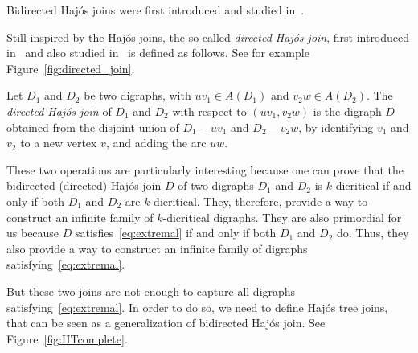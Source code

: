 Bidirected Haj\'os joins were first introduced and studied in~\cite{BBSS20}. %

Still inspired by the Haj\'os joins, the so-called \emph{directed Haj\'os join}, first introduced in~\cite{HK15} and also studied in~\cite{BBSS20} is  defined as follows.  See for example Figure~\ref{fig:directed_join}.



\begin{definition}\label{def:directed_HJ}
Let $D_1$ and $D_2$ be two digraphs, with $uv_1 \in A(D_1)$ and  $v_2w \in A(D_2)$. 
The \emph{directed Haj\'os join} of $D_1$ and $D_2$ with respect to $(uv_1, v_2w)$ is the digraph $D$ obtained from the disjoint union of $D_1- uv_1$ and $D_2 - v_2w$, by identifying $v_1$ and $v_2$ to a new vertex $v$, and adding the arc $uw$.   
\end{definition}


These two operations are particularly interesting because one can prove that the bidirected (directed) Haj\'os join 
$D$ of two digraphs $D_1$ and $D_2$ is $k$-dicritical if and only if both $D_1$ and $D_2$ are $k$-dicritical. They, therefore, provide a way to construct an infinite family of $k$-dicritical digraphs. They are also primordial for us because $D$ satisfies~\eqref{eq:extremal} if and only if both $D_1$ and $D_2$ do. Thus, they also provide a way to construct an infinite family of digraphs satisfying~\eqref{eq:extremal}.    

But these two joins are not enough to capture all digraphs satisfying~\eqref{eq:extremal}. In order to do so, we need to define Haj\'os tree joins, that can be seen as a generalization of  bidirected Haj\'os join. See Figure~\ref{fig:HTcomplete}. 



